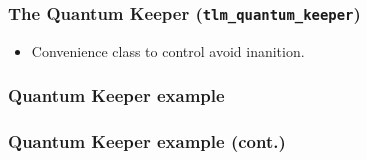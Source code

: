 {\begin{frame}
	\frametitle{The Quantum Keeper (\texttt{tlm\_quantum\_keeper})}
	\begin{itemize}
		\item Convenience class to control avoid inanition.
	\end{itemize}
	
\end{frame}

\begin{frame}
	\frametitle{Quantum Keeper example}
	
\end{frame}

\begin{frame}
	\frametitle{Quantum Keeper example (cont.)}
	
\end{frame}
}

